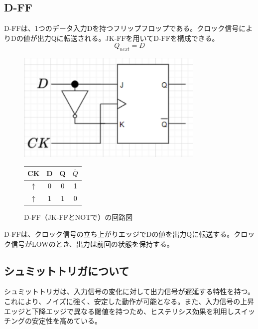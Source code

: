 \documentclass{jlreq}
\numberwithin{equation}{section}
\begin{document}
\subsection{D-FF}
D-FFは、1つのデータ入力Dを持つフリップフロップである。クロック信号によりDの値が出力Qに転送される。JK-FFを用いてD-FFを構成できる。
\begin{equation}
  Q_{next} = D
\end{equation}
\begin{figure}[H]
  \centering
  \begin{minipage}{0.45\textwidth}
    \centering
    \includegraphics[width=0.8\textwidth]{assets/d-ff.png}
    \caption{D-FF（JK-FFとNOTで）の回路図}
  \end{minipage}
  \hfill
  \begin{minipage}{0.45\textwidth}
    \centering
      \label{tab:d_ff_truth_table}
      \begin{tabular}{|c|c|c|c|}
        \hline
        CK & D & Q & $\overline{Q}$ \\ \hline
        $\uparrow$ & 0 & 0 & 1 \\ \hline
        $\uparrow$ & 1 & 1 & 0 \\ \hline
      \end{tabular}
  \end{minipage}
\end{figure}
D-FFは、クロック信号の立ち上がりエッジでDの値を出力Qに転送する。クロック信号がLOWのとき、出力は前回の状態を保持する。

\subsection{シュミットトリガについて}
シュミットトリガは、入力信号の変化に対して出力信号が遅延する特性を持つ。これにより、ノイズに強く、安定した動作が可能となる。また、入力信号の上昇エッジと下降エッジで異なる閾値を持つため、ヒステリシス効果を利用しスイッチングの安定性を高めている。
\end{document}
